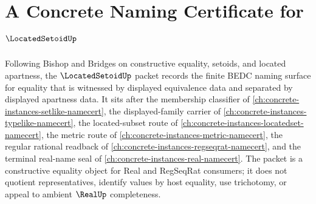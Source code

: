 \chapter{A Concrete Naming Certificate for $\LocatedSetoidUp$}
\label{ch:concrete-instances-located-setoid-namecert}

Following Bishop and Bridges on constructive equality, setoids, and located apartness, the $\LocatedSetoidUp$ packet records the finite BEDC naming surface for equality that is witnessed by displayed equivalence data and separated by displayed apartness data. It sits after the membership classifier of \autoref{ch:concrete-instances-setlike-namecert}, the displayed-family carrier of \autoref{ch:concrete-instances-typelike-namecert}, the located-subset route of \autoref{ch:concrete-instances-locatedset-namecert}, the metric route of \autoref{ch:concrete-instances-metric-namecert}, the regular rational readback of \autoref{ch:concrete-instances-regseqrat-namecert}, and the terminal real-name seal of \autoref{ch:concrete-instances-real-namecert}. The packet is a constructive equality object for Real and RegSeqRat consumers; it does not quotient representatives, identify values by host equality, use trichotomy, or appeal to ambient $\RealUp$ completeness.

